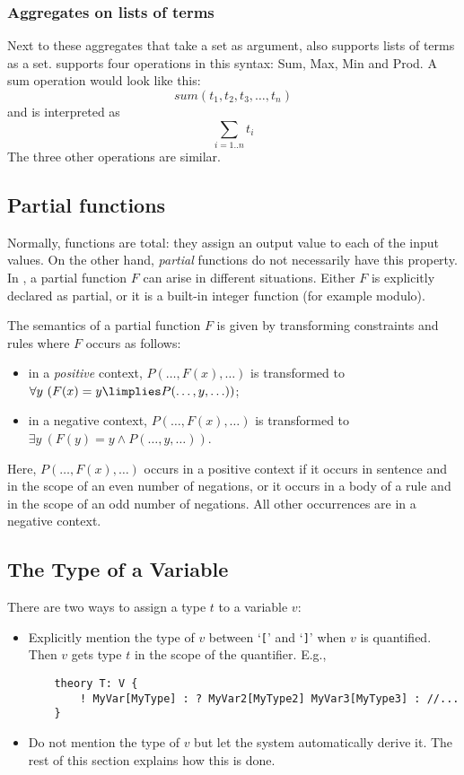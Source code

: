 \subsubsection{Aggregates on lists of terms}

Next to these aggregates that take a set as argument, \idp also supports lists of terms as a set. \idp supports four operations in this syntax: Sum, Max, Min and Prod.
A sum operation would look like this:
\[ sum(t_1,t_2,t_3,\ldots,t_n)\]
and is interpreted as \[\sum_{i=1..n} t_i\]
The three other operations are similar.

\subsection{Partial functions}\label{ssec:partial}
Normally, functions are total: they assign an output value to each of the input values. On the other hand, \emph{partial} functions do not necessarily have this property. In \idp, a partial function $F$ can arise in different situations. Either $F$ is explicitly declared as partial, or it is a built-in integer function (for example modulo).

The semantics of a partial function $F$ is given by transforming constraints and rules where $F$ occurs as follows:
\begin{itemize}
	\item in a \emph{positive} context, $P(\ldots,F(x),\ldots)$ is transformed to $\forall y\ (F(x) = y \limplies P(\ldots,y,\ldots))$;
	\item in a negative context, $P(\ldots,F(x),\ldots)$ is transformed to $\exists y\ (F(y) = y \land P(\ldots,y,\ldots))$.
\end{itemize}
Here, $P(\ldots,F(x),\ldots)$ occurs in a positive context if it occurs in sentence and in the scope of an even number of negations, or it occurs in a body of a rule and in the scope of an odd number of negations. All other occurrences are in a negative context. 

                                                              
\subsection{The Type of a Variable}\label{ssec:vtype}
There are two ways to assign a type $t$ to a variable $v$:
\begin{itemize}
	\item Explicitly mention the type of $v$ between `{\tt [}' and `{\tt ]}' when $v$ is quantified. Then $v$ gets type $t$ in the scope of the quantifier. E.g.,
	\begin{lstlisting}
	theory T: V {
		! MyVar[MyType] : ? MyVar2[MyType2] MyVar3[MyType3] : //...
	}
	\end{lstlisting}
	\item Do not mention the type of $v$ but let the system automatically derive it. The rest of this section explains how this is done.
\end{itemize}

